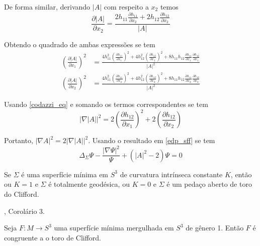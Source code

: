 \begin{demonstracao}
	De forma similar, derivando $ |A| $ com respeito a $ x_2 $ temos
	\begin{equation*}
		\frac{\partial |A|}{\partial x_2} = \frac{2 h_{11} \frac{\partial h_{11}}{\partial x_2} + 2 h_{12} \frac{\partial h_{12}}{\partial x_2}}{|A|}
	\end{equation*}
	
	Obtendo o quadrado de ambas expressões se tem
	\begin{align*}
		\left( \frac{\partial |A|}{\partial x_1} \right)^2 &= \frac{4 h_{11}^2 \left( \frac{\partial h_{11}}{\partial x_1} \right)^2 + 4 h_{12}^2 \left( \frac{\partial h_{12}}{\partial x_1} \right)^2 + 8 h_{11} h_{12} \frac{\partial h_{11}}{\partial x_1} \frac{\partial h_{12}}{\partial x_1}}{|A|^2}\\
		\left( \frac{\partial |A|}{\partial x_2} \right)^2 &= \frac{4 h_{11}^2 \left( \frac{\partial h_{11}}{\partial x_2} \right)^2 + 4 h_{12}^2 \left( \frac{\partial h_{12}}{\partial x_2} \right)^2 + 8 h_{11} h_{12} \frac{\partial h_{11}}{\partial x_2} \frac{\partial h_{12}}{\partial x_2}}{|A|^2}
	\end{align*}
	
	Usando \ref{codazzi_eq} e somando os termos correspondentes se tem
	\begin{equation*}
		| \nabla |A| |^2 = 2 \left( \frac{\partial h_{12}}{\partial x_1} \right)^2 + 2 \left( \frac{\partial h_{12}}{\partial x_2} \right)
	\end{equation*}
	
	Portanto, $ | \nabla A |^2 = 2 | \nabla |A| |^2 $. Usando o resultado em \ref{edp_sff} se tem
	\begin{equation*}
		\Delta_\Sigma \Psi - \frac{|\nabla \Psi|^2}{\Psi} + (|A|^2 - 2) \Psi = 0
	\end{equation*}
\end{demonstracao}


\begin{teorema}[Lawson]\label{teo_lawson}
	Se $\Sigma$ é uma superfície mínima em $S^3$ de curvatura intrínseca constante $K$, então ou $K=1$ e $\Sigma$ é totalmente geodésica, ou $K=0$ e $\Sigma$ é um pedaço aberto de toro do Clifford.
\end{teorema}

\begin{demonstracao}
	\cite{Lawson1969}, Corolário 3.
\end{demonstracao}

\begin{teorema}[Brendle]
	Seja $F: M \rightarrow S^3$ uma superfície mínima mergulhada em $S^3$ de gênero 1. Então $F$ é congruente a o toro de Clifford.
\end{teorema}

